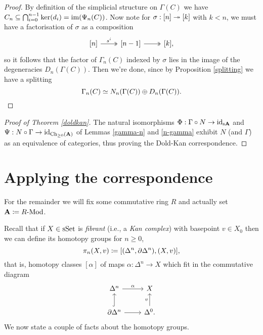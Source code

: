 \begin{proof}
  By definition of the simplicial structure on $\Gamma(C)$ we have
  $C_n \subseteq \bigcap_{i=0}^{n-1} \ker(d_i) = \operatorname{im}(\Psi_n(C))$. Now
  note for $\sigma : [n] \twoheadrightarrow [k]$ with $k < n$, we must have a
  factorisation of $\sigma$ as a composition
  \[
  \begin{tikzcd}
    {[n]} \ar[twoheadrightarrow]{r}{s^i} & {[n-1]}
    \ar[twoheadrightarrow]{r} & {[k]},
  \end{tikzcd}
  \]
  so it follows that the factor of $\Gamma_n(C)$ indexed by $\sigma$
  lies in the image of the degeneracies $D_n(\Gamma(C))$. Then we're
  done, since by Proposition \ref{splitting} we have a splitting
  \[
  \Gamma_n(C) \simeq N_n(\Gamma(C)) \oplus D_n(\Gamma(C)). \qedhere
  \]
\end{proof}

\begin{proof}[Proof of Theorem \ref{doldkan}]
  The natural isomorphisms $\Phi : \Gamma \circ N \to \operatorname{id}_{\mathrm{s}\mathbf{A}}$ and
  $\Psi : N \circ \Gamma \to \operatorname{id}_{\mathrm{Ch}_{\ge 0}(\mathbf{A})}$ of Lemmas
  \ref{gamma-n} and \ref{n-gamma} exhibit $N$ (and $\Gamma$) as an
  equivalence of categories, thus proving the Dold-Kan correspondence.
\end{proof}


\section{Applying the correspondence}

\begin{situation}
  For the remainder we will fix some commutative ring $R$ and actually
  set $\mathbf{A} \coloneqq R\text{-}\mathrm{Mod}$.
\end{situation}

Recall that if $X \in \mathrm{s}\mathrm{Set}$ is \textit{fibrant} (i.e., a \textit{Kan
  complex}) with basepoint $v \in X_0$ then we can define its homotopy
groups for $n \ge 0$,
\[
\pi_n(X,v) \coloneqq [(\Delta^n, \partial\Delta^n), (X,v)],
\]
that is, homotopy classes $[\alpha]$ of maps $\alpha : \Delta^n \to X$
which fit in the commutative diagram
\[
\begin{tikzcd}
  \Delta^n \rar{\alpha} & X \\ \del\Delta^n \ar[hookrightarrow]{u} \rar
    & \Delta^0 \uar{v}.
\end{tikzcd}
\]
We now state a couple of facts about the homotopy groups.

